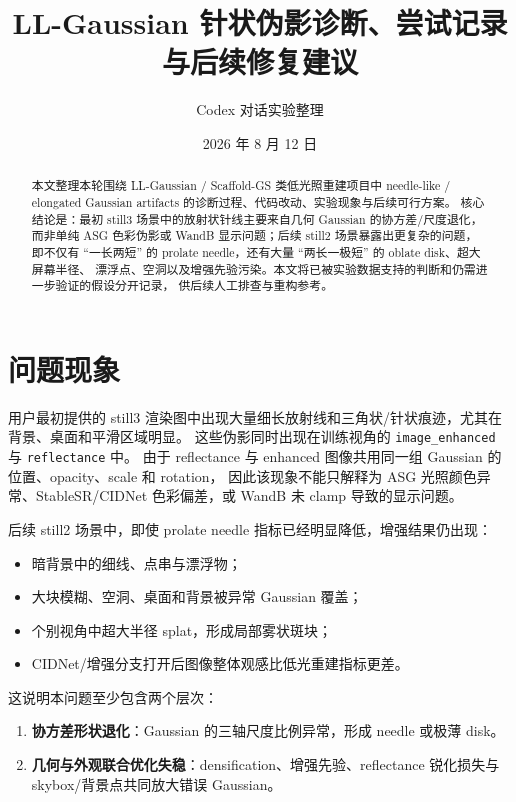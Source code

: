 \documentclass[11pt,a4paper]{article}
\title{LL-Gaussian 针状伪影诊断、尝试记录与后续修复建议}
\author{Codex 对话实验整理}
\date{2026 年 8 月 12 日}
\begin{document}
\maketitle

\begin{abstract}
本文整理本轮围绕 LL-Gaussian / Scaffold-GS 类低光照重建项目中
needle-like / elongated Gaussian artifacts 的诊断过程、代码改动、实验现象与后续可行方案。
核心结论是：最初 still3 场景中的放射状针线主要来自几何 Gaussian 的协方差/尺度退化，
而非单纯 ASG 色彩伪影或 WandB 显示问题；后续 still2 场景暴露出更复杂的问题，即不仅有
``一长两短'' 的 prolate needle，还有大量 ``两长一极短'' 的 oblate disk、超大屏幕半径、
漂浮点、空洞以及增强先验污染。本文将已被实验数据支持的判断和仍需进一步验证的假设分开记录，
供后续人工排查与重构参考。
\end{abstract}

\section{问题现象}

用户最初提供的 still3 渲染图中出现大量细长放射线和三角状/针状痕迹，尤其在背景、桌面和平滑区域明显。
这些伪影同时出现在训练视角的 \texttt{image\_enhanced} 与 \texttt{reflectance} 中。
由于 reflectance 与 enhanced 图像共用同一组 Gaussian 的位置、opacity、scale 和 rotation，
因此该现象不能只解释为 ASG 光照颜色异常、StableSR/CIDNet 色彩偏差，或 WandB 未 clamp 导致的显示问题。

后续 still2 场景中，即使 prolate needle 指标已经明显降低，增强结果仍出现：
\begin{itemize}[leftmargin=1.5em]
  \item 暗背景中的细线、点串与漂浮物；
  \item 大块模糊、空洞、桌面和背景被异常 Gaussian 覆盖；
  \item 个别视角中超大半径 splat，形成局部雾状斑块；
  \item CIDNet/增强分支打开后图像整体观感比低光重建指标更差。
\end{itemize}

这说明本问题至少包含两个层次：
\begin{enumerate}[leftmargin=1.5em]
  \item \textbf{协方差形状退化}：Gaussian 的三轴尺度比例异常，形成 needle 或极薄 disk。
  \item \textbf{几何与外观联合优化失稳}：densification、增强先验、reflectance 锐化损失与 skybox/背景点共同放大错误 Gaussian。
\end{enumerate}
\end{document}
